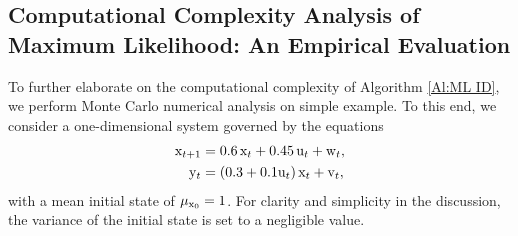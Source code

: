 \subsection{Computational Complexity Analysis of Maximum Likelihood: An Empirical Evaluation}
\label{sec:Complexity Analysis}
To further elaborate on the computational complexity of Algorithm \ref{Al:ML ID}, we perform Monte Carlo numerical analysis on simple example. To this end, we consider a one-dimensional system governed by the equations
\begin{equation}\label{eqn:simple_system}
\begin{split}
    { \mathrm{x} }_{t+1} &= 0.6\,{ \mathrm{x} }_t + 0.45\,{ \mathrm{u} }_t + { \mathrm{w} }_t,\\
    { \mathrm{y} }_t &= (0.3 + 0.1{ \mathrm{u} }_t)\, { \mathrm{x} }_t + { \mathrm{v} }_t,
\end{split}
\end{equation}
with a mean initial state of $\mu_{{ \mathrm{x} }_0} = 1$. 
For clarity and simplicity in the discussion, the variance of the initial state is set to a negligible value.
